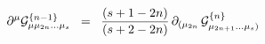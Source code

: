 \begin{equation}
\partial^\mu {\cal{G}}^{\{ n-1 \}}_{\mu \mu_{2n} ... \mu_s} \;\; = \;\; {(s+1-2n) \over (s+2-2n)} \, \partial_{( \mu_{2n}} \, {\cal{G}}^{\{ n \}}_{\mu_{2n+1} ... \mu_s )}
\label{eq:x16}
\end{equation}

